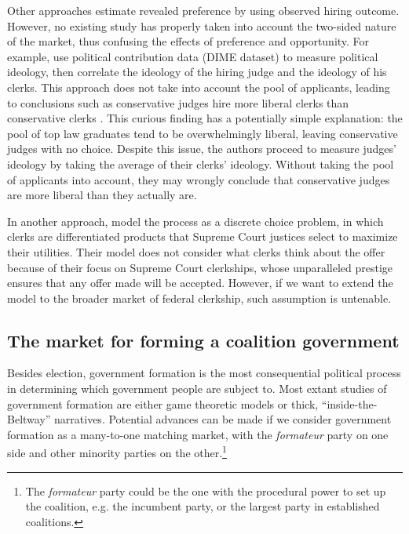 Other approaches estimate revealed preference by using observed hiring outcome.
However, no existing study has properly taken into account the two-sided nature
of the market, thus confusing the effects of preference and opportunity. For
example, \citet{Bonica2017} use political contribution data (DIME dataset) to
measure political ideology, then correlate the ideology of the hiring judge and
the ideology of his clerks. This approach does not take into account the pool of
applicants, leading to conclusions such as conservative judges hire more liberal
clerks than conservative clerks \citep[31]{Bonica2017}. This curious finding has
a potentially simple explanation: the pool of top law graduates tend to be
overwhelmingly liberal, leaving conservative judges with no choice. Despite
this issue, the authors proceed to measure judges' ideology by taking the
average of their clerks' ideology. Without taking the pool of applicants into
account, they may wrongly conclude that conservative judges are more liberal
than they actually are.

In another approach, \citet{Rozema2016} model the process as a discrete choice
problem, in which clerks are differentiated products that Supreme Court justices
select to maximize their utilities. Their model does not consider what clerks
think about the offer because of their focus on Supreme Court clerkships, whose
unparalleled prestige ensures that any offer made will be accepted. However, if
we want to extend the model to the broader market of federal clerkship, such
assumption is untenable.

\subsection{The market for forming a coalition government}

Besides election, government formation is the most consequential political
process in determining which government people are subject to. Most extant
studies of government formation are either game theoretic models or thick,
``inside-the-Beltway'' narratives. Potential advances can be made if we consider
government formation as a many-to-one matching market, with the
\textit{formateur} party on one side and other minority parties on the
other.\footnote{The \textit{formateur} party could be the one with the
  procedural power to set up the coalition, e.g. the incumbent party, or the
  largest party in established coalitions.}

